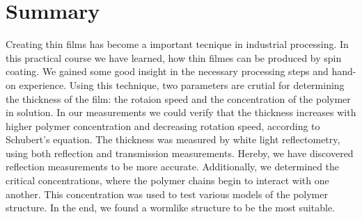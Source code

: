 

\chapter{Summary}
\label{chap:fazit}
Creating thin films has become a important tecnique in industrial processing. 
In this practical course we have learned, how thin filmes can be produced by spin coating. We gained some good insight in the necessary processing steps and hand-on experience. Using this technique, two parameters are crutial for determining the thickness of the film: the rotaion speed and the concentration of the polymer in solution. In our measurements we could verify that the thickness increases with higher polymer concentration and decreasing rotation speed, according to Schubert's equation. The thickness was measured by white light reflectometry, using both reflection and transmission measurements. Hereby, we have discovered reflection measurements to be more accurate. Additionally, we determined the critical concentrations, where the polymer chains begin to interact with one another. This concentration was used to test various models of the polymer structure. In the end, we found a wormlike structure to be the most suitable.


